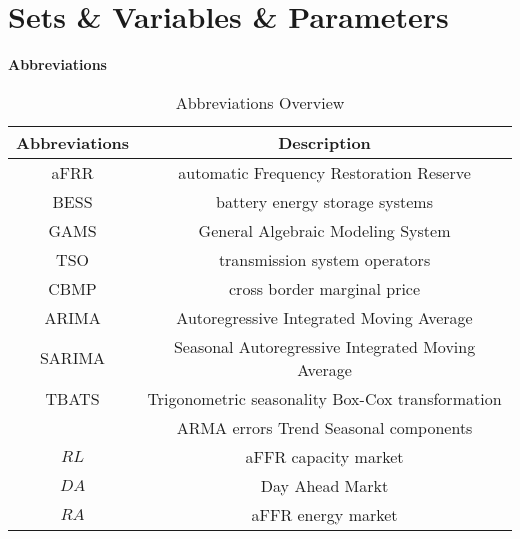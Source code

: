\chapter*{Sets \& Variables \& Parameters}
\textbf{Abbreviations}
\begin{table}[!h]
	\begin{tabular}{c|c}
		\textbf{Abbreviations} & \textbf{Description}                              \\
		\hline
		aFRR                   & automatic Frequency Restoration Reserve           \\
		BESS                   & battery energy storage systems                    \\
		GAMS                   & General Algebraic Modeling System                 \\
		TSO                    & transmission system operators                     \\
		CBMP                   & cross border marginal price                       \\
		ARIMA                  & Autoregressive Integrated Moving Average          \\
		SARIMA                 & Seasonal Autoregressive Integrated Moving Average \\
		TBATS                  & Trigonometric seasonality Box-Cox transformation  \\
		                       & ARMA errors Trend Seasonal components             \\
		$RL$                   & aFFR capacity market                              \\
		$DA$                   & Day Ahead Markt                                   \\
		$RA$                   & aFFR energy market
	\end{tabular}
	\caption{Abbreviations Overview}
	\label{tab:Abbreviations_Overview}
\end{table}\\


